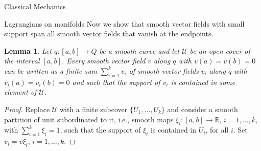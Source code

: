 \documentclass[oneside,a4paper,11pt]{amsbook}
\newcommand{\R}{\mathds R}
\theoremstyle{remark}\newtheorem{exercise}{Exercise}[chapter]
\theoremstyle{plain}\newtheorem{teo}{Theorem}[section]
\theoremstyle{plain}\newtheorem{lem}[teo]{Lemma}
\theoremstyle{plain}\newtheorem{prop}[teo]{Proposition}
\theoremstyle{plain}\newtheorem{cor}[teo]{Corollary}
\theoremstyle{definition}\newtheorem{defin}[teo]{Definition}
\theoremstyle{remark}\newtheorem{rem}[teo]{Remark}
\theoremstyle{definition}\newtheorem{notation}[teo]{Notation}
\theoremstyle{definition}\newtheorem{convention}[teo]{Convention}
\theoremstyle{definition}\newtheorem{example}[teo]{Example}
\numberwithin{section}{chapter}
\numberwithin{equation}{section}
\begin{document}
\begin{chapter}{Classical Mechanics}
\begin{section}{Lagrangians on manifolds}
Now we show that smooth vector fields with small support span all smooth vector fields that vanish at the endpoints.
\begin{lem}\label{thm:Usmallspan}
Let $q:[a,b]\to Q$ be a smooth curve and let $\mathcal U$ be an open cover of the interval $[a,b]$.
Every smooth vector field $v$ along $q$ with $v(a)=v(b)=0$ can be written as a finite sum $\sum_{i=1}^kv_i$
of smooth vector fields $v_i$ along $q$ with $v_i(a)=v_i(b)=0$ and such that the support of $v_i$ is contained
in some element of $\mathcal U$.
\end{lem}
\begin{proof}
Replace $\mathcal U$ with a finite subcover $\{U_1,\ldots,U_k\}$ and consider a smooth partition of unit subordinated to it, i.e.,
smooth maps $\xi_i:[a,b]\to\R$, $i=1,\ldots,k$, with $\sum_{i=1}^k\xi_i=1$, such that the support of $\xi_i$ is
contained in $U_i$, for all $i$. Set $v_i=v\xi_i$, $i=1,\ldots,k$.
\end{proof}


\end{section}
\end{chapter}
\end{document}
